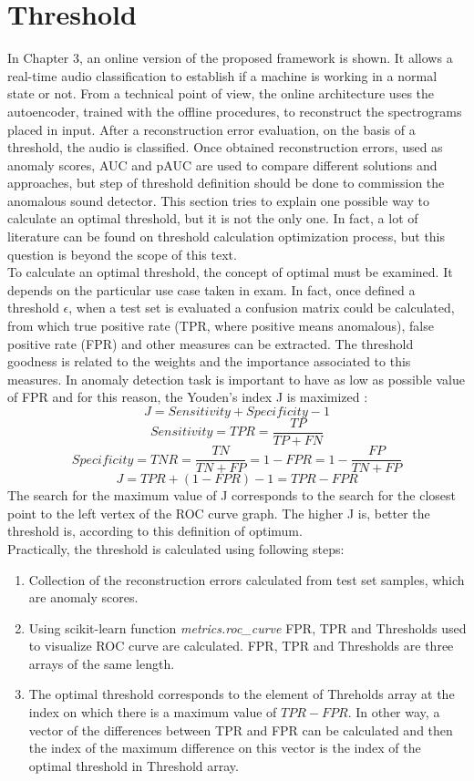 \section{Threshold}
In Chapter 3, an online version of the proposed framework is shown. It allows a real-time audio classification to establish if a machine is working in a normal state or not. From a technical point of view, the online architecture uses the autoencoder, trained with the offline procedures, to reconstruct the spectrograms placed in input. After a reconstruction error evaluation, on the basis of a threshold, the audio is classified. Once obtained reconstruction errors, used as anomaly scores, AUC and pAUC are used to compare different solutions and approaches, but step of threshold definition should be done to commission the anomalous sound detector. This section tries to explain one possible way to calculate an optimal threshold, but it is not the only one. In fact, a lot of literature can be found on threshold calculation optimization process, but this question is beyond the scope of this text. \\
To calculate an optimal threshold, the concept of optimal must be examined. It depends on the particular use case taken in exam. In fact, once defined a threshold $\epsilon$, when a test set is evaluated a confusion matrix could be calculated, from which true positive rate (TPR, where positive means anomalous), false positive rate (FPR) and other measures can be extracted. The threshold goodness is related to the weights and the importance associated to this measures. In anomaly detection task is important to have as low as possible value of FPR and for this reason, the Youden's index J is maximized \cite{13RealTimeDetectionUsingSequentialAutoencoder}:
\[ J = Sensitivity + Specificity - 1\]
\[ Sensitivity = TPR = \frac{TP}{TP+FN}\]
\[ Specificity = TNR = \frac{TN}{TN+FP} = 1-FPR = 1-\frac{FP}{TN+FP}\]
\[ J = TPR+(1-FPR)-1 = TPR-FPR \]
The search for the maximum value of J corresponds to the search for the closest point to the left vertex of the ROC curve graph. The higher J is, better the threshold is, according to this definition of optimum.\\
Practically, the threshold is calculated using following steps:
\begin{enumerate}
    \item {Collection of the reconstruction errors calculated from test set samples, which are anomaly scores.}
    \item {Using scikit-learn function \textit{metrics.roc\_curve} FPR, TPR and Thresholds used to visualize ROC curve are calculated. FPR, TPR and Thresholds are three arrays of the same length.}
    \item {The optimal threshold corresponds to the element of Threholds array at the index on which there is a maximum value of $TPR-FPR$. In other way, a vector of the differences between TPR and FPR can be calculated and then the index of the maximum difference on this vector is the index of the optimal threshold in Threshold array.}
\end{enumerate}
